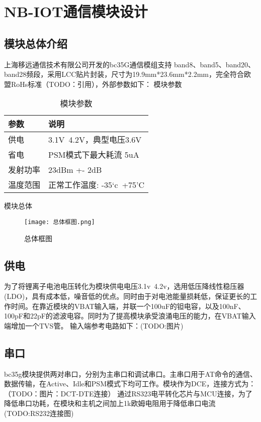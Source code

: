 
\chapter{NB-IOT通信模块设计}
\section{模块总体介绍}

上海移远通信技术有限公司开发的bc35G通信模组支持 band8、band5、band20、band28频段，采用LCC贴片封装，尺寸为19.9mm*23.6mm*2.2mm，完全符合欧盟RoHs标准（TODO：引用），外部参数如下：
模块参数

\begin{table}[h!]
\caption{模块参数}
\begin{tabular}{ll}
\toprule
参数&说明\\
\midrule
供电&3.1V~4.2V，典型电压3.6V\\
省电&PSM模式下最大耗流 5uA\\
发射功率&23dBm +- 2dB\\
温度范围&正常工作温度: -35‘c~+75'C\\
\bottomrule
\end{tabular}
\label{模块参数}
\end{table}

模块总体

\begin{figure}[h]
    \floatcontinue
	\texttt{[image: 总体框图.png]}
	\caption{总体框图}
	\label{总体框图}
\end{figure}


\section{供电}
为了将锂离子电池电压转化为模块供电电压3.1v~4.2v，选用低压降线性稳压器(LDO)，具有成本低，噪音低的优点。同时由于对电池能量损耗低，保证更长的工作时间。在靠近模块的VBAT输入端，并联一个100uF的钽电容，以及100nF、100pF和22pF的滤波电容。同时为了提高模块承受浪涌电压的能力，在VBAT输入端增加一个TVS管。
输入端参考电路如下：(TODO:图片)

\section{串口}
bc35g模块提供两对串口，分别为主串口和调试串口。主串口用于AT命令的通信、数据传输，在Active、Idle和PSM模式下均可工作。模块作为DCE，连接方式为：（TODO：图片：DCT-DTE连接）
通过RS323电平转化芯片与MCU连接，为了降低串口功耗，在模块和主机之间加上1k欧姆电阻用于降低串口电流(TODO:RS232连接图)

